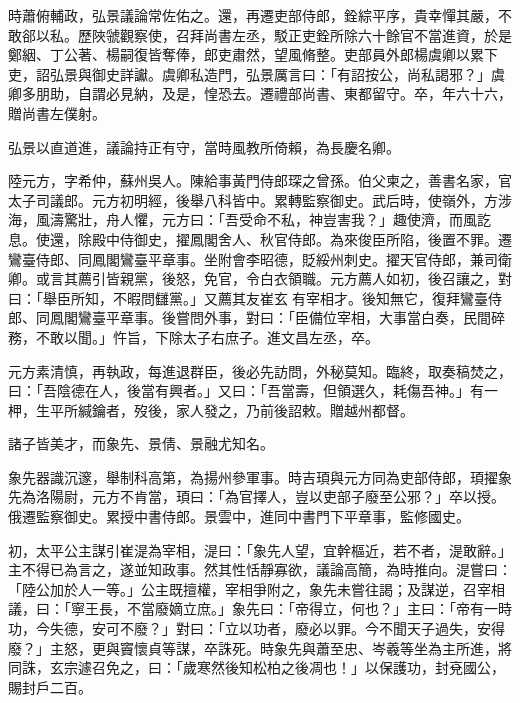 \begin{pinyinscope}
 時蕭俯輔政，弘景議論常佐佑之。還，再遷吏部侍郎，銓綜平序，貴幸憚其嚴，不敢郤以私。歷陜虢觀察使，召拜尚書左丞，駁正吏銓所除六十餘官不當進資，於是鄭絪、丁公著、楊嗣復皆奪俸，郎吏肅然，望風脩整。吏部員外郎楊虞卿以累下吏，詔弘景與御史詳讞。虞卿私造門，弘景厲言曰：「有詔按公，尚私謁邪？」虞卿多朋助，自謂必見納，及是，惶恐去。遷禮部尚書、東都留守。卒，年六十六，贈尚書左僕射。



 弘景以直道進，議論持正有守，當時風教所倚賴，為長慶名卿。



 陸元方，字希仲，蘇州吳人。陳給事黃門侍郎琛之曾孫。伯父柬之，善書名家，官太子司議郎。元方初明經，後舉八科皆中。累轉監察御史。武后時，使嶺外，方涉海，風濤驚壯，舟人懼，元方曰：「吾受命不私，神豈害我？」趣使濟，而風訖息。使還，除殿中侍御史，擢鳳閣舍人、秋官侍郎。為來俊臣所陷，後置不罪。遷鸞臺侍郎、同鳳閣鸞臺平章事。坐附會李昭德，貶綏州刺史。擢天官侍郎，兼司衛卿。或言其薦引皆親黨，後怒，免官，令白衣領職。元方薦人如初，後召讓之，對曰：「舉臣所知，不暇問讎黨。」又薦其友崔玄有宰相才。後知無它，復拜鸞臺侍郎、同鳳閣鸞臺平章事。後嘗問外事，對曰：「臣備位宰相，大事當白奏，民間碎務，不敢以聞。」忤旨，下除太子右庶子。進文昌左丞，卒。



 元方素清慎，再執政，每進退群臣，後必先訪問，外秘莫知。臨終，取奏稿焚之，曰：「吾陰德在人，後當有興者。」又曰：「吾當壽，但領選久，耗傷吾神。」有一柙，生平所緘鑰者，歿後，家人發之，乃前後詔敕。贈越州都督。



 諸子皆美才，而象先、景倩、景融尤知名。



 象先器識沉邃，舉制科高第，為揚州參軍事。時吉頊與元方同為吏部侍郎，頊擢象先為洛陽尉，元方不肯當，頊曰：「為官擇人，豈以吏部子廢至公邪？」卒以授。俄遷監察御史。累授中書侍郎。景雲中，進同中書門下平章事，監修國史。



 初，太平公主謀引崔湜為宰相，湜曰：「象先人望，宜幹樞近，若不者，湜敢辭。」主不得已為言之，遂並知政事。然其性恬靜寡欲，議論高簡，為時推向。湜嘗曰：「陸公加於人一等。」公主既擅權，宰相爭附之，象先未嘗往謁；及謀逆，召宰相議，曰：「寧王長，不當廢嫡立庶。」象先曰：「帝得立，何也？」主曰：「帝有一時功，今失德，安可不廢？」對曰：「立以功者，廢必以罪。今不聞天子過失，安得廢？」主怒，更與竇懷貞等謀，卒誅死。時象先與蕭至忠、岑羲等坐為主所進，將同誅，玄宗遽召免之，曰：「歲寒然後知松柏之後凋也！」以保護功，封兗國公，賜封戶二百。




\end{pinyinscope}

